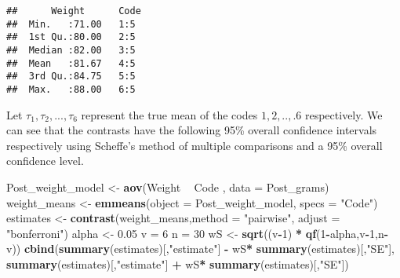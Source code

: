 \documentclass[12pt,]{article}
\newenvironment{Shaded}{\begin{snugshade}}{\end{snugshade}}
\newcommand{\KeywordTok}[1]{\textcolor[rgb]{0.13,0.29,0.53}{\textbf{#1}}}
\newcommand{\DataTypeTok}[1]{\textcolor[rgb]{0.13,0.29,0.53}{#1}}
\newcommand{\DecValTok}[1]{\textcolor[rgb]{0.00,0.00,0.81}{#1}}
\newcommand{\FloatTok}[1]{\textcolor[rgb]{0.00,0.00,0.81}{#1}}
\newcommand{\StringTok}[1]{\textcolor[rgb]{0.31,0.60,0.02}{#1}}
\newcommand{\OperatorTok}[1]{\textcolor[rgb]{0.81,0.36,0.00}{\textbf{#1}}}
\newcommand{\NormalTok}[1]{#1}
\begin{document}
\begin{Shaded}
\end{Shaded}

\begin{verbatim}
##      Weight      Code 
##  Min.   :71.00   1:5  
##  1st Qu.:80.00   2:5  
##  Median :82.00   3:5  
##  Mean   :81.67   4:5  
##  3rd Qu.:84.75   5:5  
##  Max.   :88.00   6:5
\end{verbatim}

Let \(\tau_1,\tau_2,...,\tau_6\) represent the true mean of the codes
\(1,2,..,.6\) respectively. We can see that the contrasts have the
following 95\% overall confidence intervals respectively using Scheffe's
method of multiple comparisons and a 95\% overall confidence level.

\begin{Shaded}
\begin{Highlighting}[]
\NormalTok{Post_weight_model <-}\StringTok{ }\KeywordTok{aov}\NormalTok{(Weight }\OperatorTok{~}\StringTok{ }\NormalTok{Code , }\DataTypeTok{data =}\NormalTok{ Post_grams)}
\NormalTok{weight_means <-}\StringTok{ }\KeywordTok{emmeans}\NormalTok{(}\DataTypeTok{object =}\NormalTok{ Post_weight_model, }\DataTypeTok{specs =} \StringTok{"Code"}\NormalTok{)}
\NormalTok{estimates <-}\StringTok{ }\KeywordTok{contrast}\NormalTok{(weight_means,}\DataTypeTok{method =} \StringTok{"pairwise"}\NormalTok{, }\DataTypeTok{adjust =} \StringTok{"bonferroni"}\NormalTok{)}
\NormalTok{alpha <-}\StringTok{ }\FloatTok{0.05}
\NormalTok{v =}\StringTok{ }\DecValTok{6}
\NormalTok{n =}\StringTok{ }\DecValTok{30}
\NormalTok{wS <-}\StringTok{ }\KeywordTok{sqrt}\NormalTok{((v}\OperatorTok{-}\DecValTok{1}\NormalTok{) }\OperatorTok{*}\StringTok{ }\KeywordTok{qf}\NormalTok{(}\DecValTok{1}\OperatorTok{-}\NormalTok{alpha,v}\OperatorTok{-}\DecValTok{1}\NormalTok{,n}\OperatorTok{-}\NormalTok{v))}
\KeywordTok{cbind}\NormalTok{(}\KeywordTok{summary}\NormalTok{(estimates)[,}\StringTok{"estimate"}\NormalTok{] }\OperatorTok{-}\StringTok{ }\NormalTok{wS}\OperatorTok{*}\StringTok{ }\KeywordTok{summary}\NormalTok{(estimates)[,}\StringTok{"SE"}\NormalTok{],}
      \KeywordTok{summary}\NormalTok{(estimates)[,}\StringTok{"estimate"}\NormalTok{] }\OperatorTok{+}\StringTok{ }\NormalTok{wS}\OperatorTok{*}\StringTok{ }\KeywordTok{summary}\NormalTok{(estimates)[,}\StringTok{"SE"}\NormalTok{])}
\end{Highlighting}
\end{Shaded}
\end{document}
